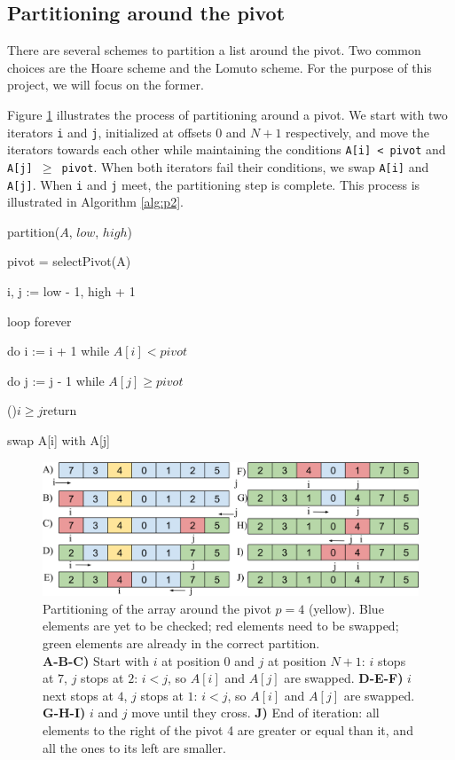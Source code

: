 \documentclass[]{finalproject}
\begin{document}
\subsection{Partitioning around the pivot}
There are several schemes to partition a list around the pivot. Two common choices are the Hoare scheme and the Lomuto scheme. For the purpose of this project, we will focus on the former.

Figure \ref{fig:rec-part2} illustrates the process of partitioning around a pivot. We start with two iterators \texttt{i} and \texttt{j}, initialized at offsets $0$ and $N+1$ respectively, and move the iterators towards each other while maintaining the conditions \texttt{A[i] < pivot} and \texttt{A[j] $\geq$ pivot}. When both iterators fail their conditions, we swap \texttt{A[i]} and \texttt{A[j]}. When \texttt{i} and \texttt{j} meet, the partitioning step is complete. This process is illustrated in Algorithm \ref{alg:p2}.

\begin{algorithm}
\caption{partition($A$, $low$, $high$)}
\label{alg:p2}

pivot = selectPivot(A)

i, j := low - 1, high + 1

loop forever

\Indp

do i := i + 1 while $A[i] < pivot$

do j := j - 1 while $A[j] \geq pivot$

\If(){$i \geq j$}{return}

swap A[i] with A[j]
\end{algorithm}

\begin{figure}[H]
\begin{center}
\includegraphics[scale=0.4]{img/pivot_partitioning.png}
\end{center}
\caption{Partitioning of the array around the pivot $p=4$ (yellow).
Blue elements are yet to be checked; red elements need to be swapped; green elements are already in the correct partition.\\
\textbf{A-B-C)} Start with $i$ at position $0$ and $j$ at position $N+1$: $i$ stops at $7$, $j$ stops at $2$: $i<j$, so $A[i]$ and $A[j]$ are swapped.
\textbf{D-E-F)} $i$ next stops at $4$, $j$ stops at $1$: $i<j$, so $A[i]$ and $A[j]$ are swapped.
\textbf{G-H-I)} $i$ and $j$ move until they cross.
\textbf{J)} End of iteration: all elements to the right of the pivot 4 are greater or equal than it, and all the ones to its left are smaller.}
\label{fig:rec-part2}
\end{figure}
\end{document}
